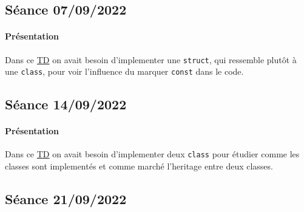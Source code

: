 \documentclass{article}
\begin{document}
\subsection{Séance 07/09/2022}
\paragraph{Présentation}Dans ce \href{https://perso.ensta-paris.fr/~bmonsuez/Cours/doku.php?id=in204:seances:seance1}{TD} on avait besoin d'implementer une \texttt{struct}, qui ressemble plutôt à une \texttt{class}, pour voir l'influence du marquer \texttt{const} dans le code.
\begin{scriptsize}\mycode
    
\end{scriptsize}
\begin{scriptsize}\mycode
    
\end{scriptsize}

\newpage\subsection{Séance 14/09/2022}
\paragraph{Présentation}Dans ce \href{https://perso.ensta-paris.fr/~bmonsuez/Cours/doku.php?id=in204:seances:seance2}{TD} on avait besoin d'implementer deux \texttt{class} pour étudier comme les classes sont implementés et comme marché l'heritage entre deux classes.
\begin{scriptsize}\mycode
    
\end{scriptsize}
\begin{scriptsize}\mycode
    
\end{scriptsize}
\begin{scriptsize}\mycode
    
\end{scriptsize}

\newpage\subsection{Séance 21/09/2022}
\end{document}
